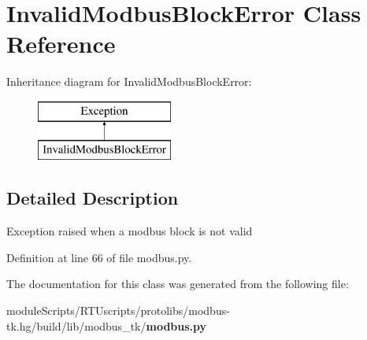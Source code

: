 \section{Invalid\+Modbus\+Block\+Error Class Reference}
\label{classmodbus__tk_1_1modbus_1_1_invalid_modbus_block_error}
Inheritance diagram for Invalid\+Modbus\+Block\+Error\+:\begin{figure}[H]
\begin{center}
\leavevmode
\includegraphics[height=2.000000cm]{classmodbus__tk_1_1modbus_1_1_invalid_modbus_block_error}
\end{center}
\end{figure}


\subsection{Detailed Description}
\begin{DoxyVerb}Exception raised when a modbus block is not valid\end{DoxyVerb}
 

Definition at line 66 of file modbus.\+py.



The documentation for this class was generated from the following file\+:\begin{DoxyCompactItemize}
\item 
module\+Scripts/\+R\+T\+Uscripts/protolibs/modbus-\/tk.\+hg/build/lib/modbus\+\_\+tk/{\bf modbus.\+py}\end{DoxyCompactItemize}
